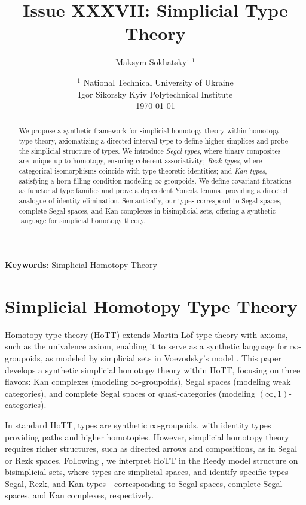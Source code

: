 \documentclass{article}
\begin{document}
\title{Issue XXXVII: Simplicial Type Theory}
\author{Maksym Sokhatskyi $^1$}
\date{ $^1$ National Technical University of Ukraine \\
       \small Igor Sikorsky Kyiv Polytechnical Institute \\
       \today }

\maketitle

\begin{abstract}
We propose a synthetic framework for simplicial homotopy theory within
homotopy type theory, axiomatizing a directed interval type to define
higher simplices and probe the simplicial structure of types.
We introduce \emph{Segal types}, where binary composites are
unique up to homotopy, ensuring coherent associativity; \emph{Rezk types},
where categorical isomorphisms coincide with type-theoretic identities;
and \emph{Kan types}, satisfying a horn-filling condition modeling $\infty$-groupoids.
We define covariant fibrations as functorial type families and prove a dependent
Yoneda lemma, providing a directed analogue of identity elimination.
Semantically, our types correspond to Segal spaces, complete Segal spaces,
and Kan complexes in bisimplicial sets, offering a synthetic language for
simplicial homotopy theory.
\end{abstract}

{\bf Keywords}: Simplicial Homotopy Theory


\ifincludeTOC
  \newpage
  \tableofcontents
\else
\fi

\newpage
\section{Simplicial Homotopy Type Theory}

Homotopy type theory (HoTT) \cite{Uni13} extends Martin-L\"of type theory with axioms, such as the univalence axiom, enabling it to serve as a synthetic language for $\infty$-groupoids, as modeled by simplicial sets in Voevodsky’s model \cite{KL12}. This paper develops a synthetic simplicial homotopy theory within HoTT, focusing on three flavors: Kan complexes (modeling $\infty$-groupoids), Segal spaces (modeling weak categories), and complete Segal spaces or quasi-categories (modeling $(\infty,1)$-categories).

In standard HoTT, types are synthetic $\infty$-groupoids, with identity types providing paths and higher homotopies. However, simplicial homotopy theory requires richer structures, such as directed arrows and compositions, as in Segal or Rezk spaces. Following \cite{Shu15}, we interpret HoTT in the Reedy model structure on bisimplicial sets, where types are simplicial spaces, and identify specific types—Segal, Rezk, and Kan types—corresponding to Segal spaces, complete Segal spaces, and Kan complexes, respectively.
\end{document}
